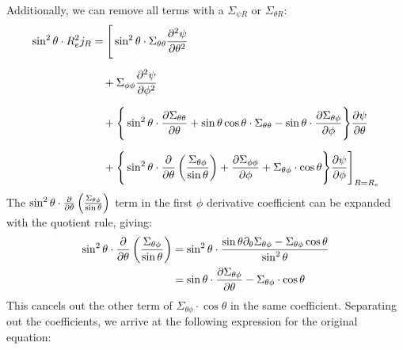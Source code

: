 \documentclass{article}
\begin{document}
Additionally, we can remove all terms with a $\Sigma_{\psi R}$ or $\Sigma_{\theta R}$:
\begin{equation*}
	\begin{aligned}
		\sin^2\theta \cdot R_e^2j_R
		 & =  \Bigg[
			\sin^2 \theta \cdot  \Sigma_{\theta\theta}
		\pdv[2]{\psi}{\theta}                                                     \\[6pt]
		 & \quad + \Sigma_{\phi\phi}
		\pdv[2]{\psi}{\phi}                                                       \\[6pt]
		 & \quad + \Bigg\{
		\sin^2\theta\cdot \pdv{\Sigma_{\theta\theta}}{\theta}
		+ \sin \theta\cos\theta\cdot \Sigma_{\theta\theta}
		- \sin\theta\cdot\pdv{\Sigma_{\theta\phi}}{\phi}\Bigg\}\pdv{\psi}{\theta} \\[6pt]
		 & \quad + \Bigg\{\sin^2\theta\cdot\pdv{\theta}
		\left( \frac{\Sigma_{\theta\phi}}{\sin\theta} \right) +
		\pdv{\Sigma_{\phi\phi}}{\phi}
		+ \Sigma_{\theta\phi}\cdot\cos\theta
		\Bigg\}\pdv{\psi}{\phi}
		\Bigg]_{R = R_e}
	\end{aligned}
\end{equation*}
The $\sin^2 \theta \cdot \pdv\theta \left(\frac{\Sigma_{\theta\phi}}{\sin\theta}\right)$
term in the first $\phi$ derivative coefficient can be expanded with the quotient rule, giving:
\begin{equation*}
	\begin{aligned}
		\sin^2 \theta \cdot \pdv\theta \left(\frac{\Sigma_{\theta\phi}}{\sin\theta}\right)
		 & =
		\sin^2\theta \cdot\frac{\sin\theta\partial_\theta\Sigma_{\theta\phi} - \Sigma_{\theta\phi}\cos\theta}{\sin^2\theta} \\
		 & = \sin\theta\cdot\pdv{\Sigma_{\theta\phi}}{\theta} - \Sigma_{\theta\phi}\cdot \cos\theta                         \\
	\end{aligned}
\end{equation*}
This cancels out the other term of $\Sigma_{\theta\phi}\cdot \cos\theta$ in the same coefficient. Separating out the coefficients, we arrive at the following expression for the original equation:
\end{document}

